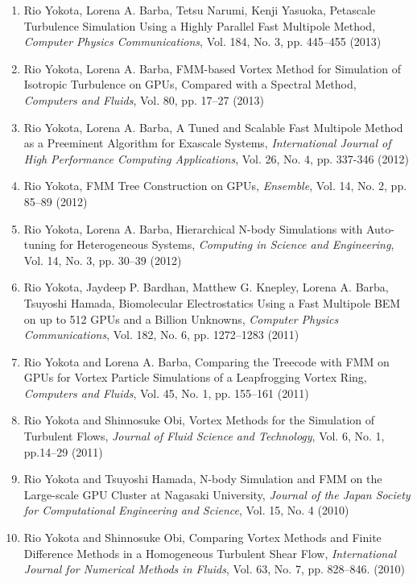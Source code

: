 \documentclass[margin,line]{cv}
\begin{document}
\begin{resume}
\begin{enumerate}
\item Rio Yokota, Lorena A. Barba, Tetsu Narumi, Kenji Yasuoka, Petascale Turbulence Simulation Using a Highly Parallel Fast Multipole Method, {\it Computer Physics Communications}, Vol. 184, No. 3, pp. 445--455 (2013)

\item Rio Yokota, Lorena A. Barba, FMM-based Vortex Method for Simulation of Isotropic Turbulence on GPUs, Compared with a Spectral Method, {\it Computers and Fluids}, Vol. 80, pp. 17--27 (2013)

\item Rio Yokota, Lorena A. Barba, A Tuned and Scalable Fast Multipole Method as a Preeminent Algorithm for Exascale Systems, {\it International Journal of High Performance Computing Applications}, Vol. 26, No. 4, pp. 337-346 (2012)

\item Rio Yokota, FMM Tree Construction on GPUs,  {\it Ensemble}, Vol. 14, No. 2, pp. 85--89 (2012)

\item Rio Yokota, Lorena A. Barba, Hierarchical N-body Simulations with Auto-tuning for Heterogeneous Systems,  {\it Computing in Science and Engineering}, Vol. 14, No. 3, pp. 30--39 (2012)

\item Rio Yokota, Jaydeep P. Bardhan, Matthew G. Knepley, Lorena A. Barba, Tsuyoshi Hamada, Biomolecular Electrostatics Using a Fast Multipole BEM on up to 512 GPUs and a Billion Unknowns, {\it Computer Physics Communications}, Vol. 182, No. 6, pp. 1272--1283 (2011)

\item Rio Yokota and Lorena A. Barba, Comparing the Treecode with FMM on GPUs for Vortex Particle Simulations of a Leapfrogging Vortex Ring, {\it Computers and Fluids}, Vol. 45, No. 1, pp. 155--161 (2011)

\item Rio Yokota and Shinnosuke Obi, Vortex Methods for the Simulation of Turbulent Flows, {\it Journal of Fluid Science and Technology}, Vol. 6, No. 1, pp.14--29 (2011)

\item Rio Yokota and Tsuyoshi Hamada, N-body Simulation and FMM on the Large-scale GPU Cluster at Nagasaki University, {\it Journal of the Japan Society for Computational Engineering and Science}, Vol. 15, No. 4 (2010)

\item Rio Yokota and Shinnosuke Obi, Comparing Vortex Methods and Finite Difference Methods in a Homogeneous Turbulent Shear Flow, {\it International Journal for Numerical Methods in Fluids}, Vol. 63, No. 7, pp. 828--846. (2010)


\end{enumerate}
\end{resume}
\end{document}
